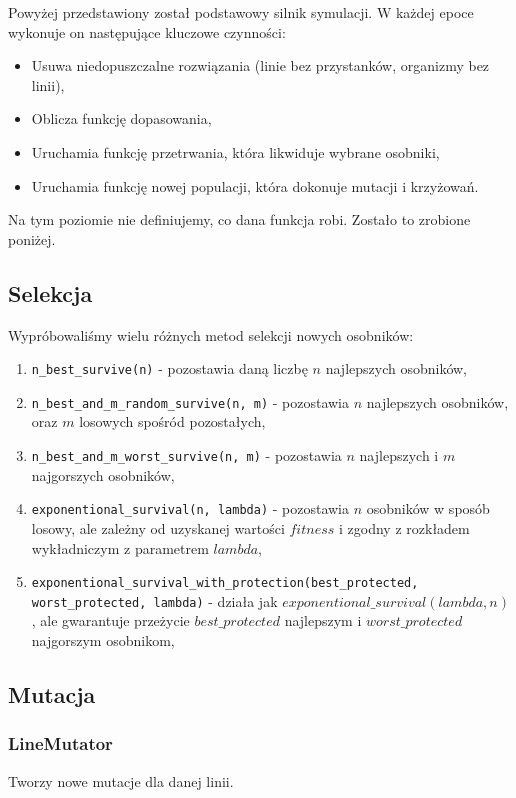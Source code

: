 \documentclass[12pt,a4paper]{article}
\begin{document}
Powyżej przedstawiony został podstawowy silnik symulacji. W każdej epoce wykonuje on następujące kluczowe czynności:
\begin{itemize}
    \item Usuwa niedopuszczalne rozwiązania (linie bez przystanków, organizmy bez linii),
    \item Oblicza funkcję dopasowania,
    \item Uruchamia funkcję przetrwania, która likwiduje wybrane osobniki,
    \item Uruchamia funkcję nowej populacji, która dokonuje mutacji i krzyżowań.
\end{itemize}

Na tym poziomie nie definiujemy, co dana funkcja robi. Zostało to zrobione poniżej.

\subsection{Selekcja}
\label{sec:selection}
Wypróbowaliśmy wielu różnych metod selekcji nowych osobników:
\begin{enumerate}
    \item \lstinline{n_best_survive(n)} - pozostawia daną liczbę $n$ najlepszych osobników,
    \item \lstinline{n_best_and_m_random_survive(n, m)} - pozostawia $n$ najlepszych osobników, oraz $m$ losowych spośród pozostałych,
    \item \lstinline{n_best_and_m_worst_survive(n, m)} - pozostawia $n$ najlepszych i $m$ najgorszych osobników,
    \item \lstinline{exponentional_survival(n, lambda)} - pozostawia $n$ osobników w sposób losowy, ale zależny od uzyskanej wartości $fitness$ i zgodny z rozkładem wykładniczym z parametrem $lambda$,
    \item \lstinline{exponentional_survival_with_protection(best_protected, worst_protected, lambda)} - działa jak $exponentional\_survival(lambda, n)$, ale gwarantuje przeżycie $best\_protected$ najlepszym i $worst\_protected$ najgorszym osobnikom,
\end{enumerate}

\subsection{Mutacja}

\subsubsection{LineMutator}
Tworzy nowe mutacje dla danej linii.
\end{document}
